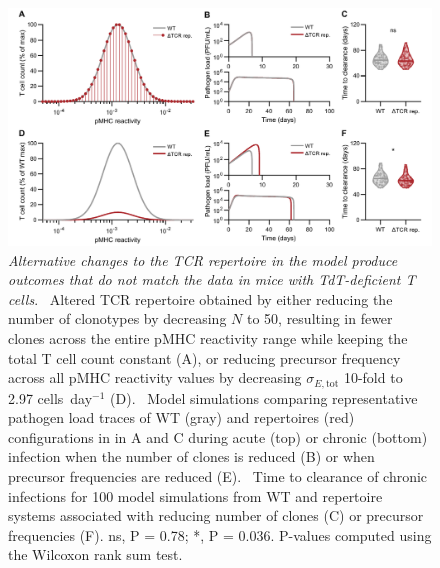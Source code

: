 \begin{figure}
    \centering
    \includegraphics[width=\textwidth]{Figures/AvC/figS5_alternativeKO.pdf}
    \caption[Alternative changes to the TCR repertoire in the model produce outcomes that do not match the data in mice with TdT-deficient T cells]{\textit{Alternative changes to the TCR repertoire in the model produce outcomes that do not match the data in mice with TdT-deficient T cells}. %
    ~Altered TCR repertoire obtained by either reducing the number of clonotypes by decreasing $N$ to 50, resulting in fewer clones across the entire pMHC reactivity range while keeping the total T cell count constant (A), or reducing precursor frequency across all pMHC reactivity values by decreasing $\sigma_{E,\textrm{tot}}$ 10-fold to 2.97 cells~day$^{-1}$ (D). %
    ~Model simulations comparing representative pathogen load traces of WT (gray) and \dTCR{} repertoires (red) configurations in in A and C during acute (top) or chronic (bottom) infection when the number of clones is reduced (B) or when precursor frequencies are reduced (E). %
    ~Time to clearance of chronic infections for 100 model simulations from WT and \dTCR{} repertoire systems associated with reducing number of clones (C) or precursor frequencies (F). ns, P = 0.78; *, P = 0.036. P-values computed using the Wilcoxon rank sum test.}
    \label{fig:AvC_supp_alternativeKO}
\end{figure}

